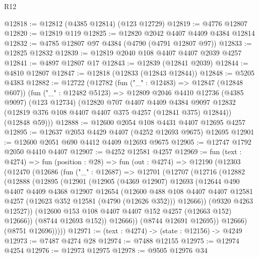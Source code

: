 \begin{lexlean}{R12}
\begin{coremodule}
@12818 := @12812 (@4385 @12814) (@123 @12729)
@12819 := @4776 @12807
@12820 := @12819 @119
@12825 := @12820 @2042 @4407 @4409 @4384 @12814
@12832 := @4785 @12807 @97 @4384 (@4790 (@4791 @12807 @97))
@12833 := @12825 @12832
@12839 := @12819 @2040 @108 @4407 @4407 @2039 @4257
@12841 := @4897 @12807 @17
@12843 := @12839 (@12841 @2039)
@12844 := @4810 @12807
@12847 := @12818 (@12833 (@12843 @12844))
@12848 := @5205 @4383
@12882 := @12722
    (@12782
      (fun ("_" : @12483) => @12847 (@12848 @607))
      (fun ("_" : @12482 @5123) =>
      @12809
        @2046
        @4410
        @12736
        (@4385 @9097)
        (@123 @12734)
        (@12820
          @707
          @4407
          @4409
          @4384
          @9097
          @12832
          (@12819 @376 @108 @4407 @4407 @375 @4257 (@12841 @375) @12844))
        (@12848 @59)))
@12888 := @12600 @2054 @108 @4431 @4407 @12695 @4257
@12895 := @12637 @2053 @4429 @4407 (@4252 @12693 @9675) @12695
@12901 := @12600 @2051 @690 @4412 @4409 @12693 @9675
@12905 := @12747 @1792 @2050 @4410 @4407
@12907 := @4252 @12581 @4257
@12969 := fun (text : @4274) =>
  fun (position : @28) =>
  fun (out : @4274) =>
  @12190
    (@12303
      (@12470
        (@12686
          (fun ("_" : @12687) =>
          @12701
            (@12707
              (@12716
                (@12882
                  (@12888
                    (@12895
                      (@12901
                        (@12905
                          (@4369 @12907)
                          @12693
                          (@12644
                            @490
                            @4407
                            @4409
                            @4368
                            @12907
                            @12654
                            (@12600
                              @488
                              @108
                              @4407
                              @4407
                              @12581
                              @4257
                              (@12623 @352 @12581 (@4790 (@12626 @352)))
                              @12666))
                          (@9320 @4263 @12527))
                        (@12600 @153 @108 @4407 @4407 @152 @4257 (@12663 @152) @12666))
                      (@8744 @12693 @152))
                    @12666))
                (@8744 @12691 @12695))
              @12666)
            (@8751 @12696)))))
@12971 := (text : @4274) -> (state : @12156) -> @4249
@12973 := @7487 @4274 @28
@12974 := @7488 @12155
@12975 := @12974 @4254
@12976 := @12973 @12975
@12978 := @9505 @12976 @34

\end{coremodule}
\end{lexlean}
